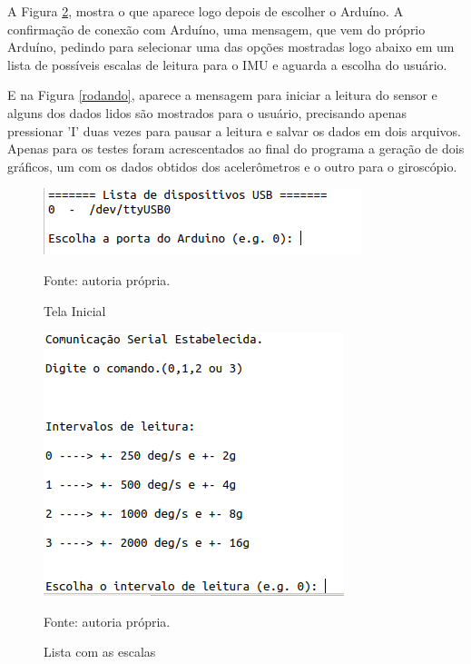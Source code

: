 	A Figura \ref{lista_ranges}, mostra o que aparece logo depois de escolher o Arduíno. A confirmação de conexão com Arduíno, uma mensagem, que vem do próprio Arduíno, pedindo para selecionar uma das opções mostradas logo abaixo em um lista de possíveis escalas de leitura para o IMU e aguarda a escolha do usuário.
	
	E na Figura \ref{rodando}, aparece a mensagem para iniciar a leitura do sensor e alguns dos dados lidos são mostrados para o usuário, precisando apenas pressionar 'I' duas vezes para pausar a leitura e salvar os dados em dois arquivos. Apenas para os testes foram acrescentados ao final do programa a geração de dois gráficos, um com os dados obtidos dos acelerômetros e o outro para o giroscópio. 
	 	
	 	\begin{figure}[h]
	 		\centering
	 		\includegraphics[keepaspectratio=true,scale=0.6]{figuras/tela_inicial.png}
	 		\caption{Tela Inicial}
	 		Fonte: autoria própria. 
	 		\label{tela_inicial}	
	 	\end{figure}
	
	\begin{figure}[h]
		\centering
		\includegraphics[keepaspectratio=true,scale=0.6]{figuras/lista_ranges.png}
		\caption{Lista com as escalas}
		Fonte: autoria própria. 
		\label{lista_ranges}	
	\end{figure}
	
